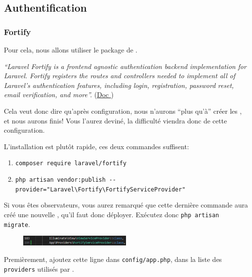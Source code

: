 \subsection[Authentification]{Authentification}\label{sec:auth}

\subsubsection[Fortify][laravel.com/docs/10.x/fortify]{Fortify}

Pour cela, nous allons utiliser le package \fortify{} de \laravel{}. 

\textit{``Laravel Fortify is a frontend agnostic authentication backend implementation for Laravel. Fortify registers the routes and controllers needed to implement all of Laravel's authentication features, including login, registration, password reset, email verification, and more''.} (\href{https://laravel.com/docs/10.x/fortify#what-is-fortify}{Doc \laravel})

Cela veut donc dire qu'après configuration, nous n'aurons ``plus qu'à'' créer les \views, et nous aurons finis! Vous l'aurez deviné, la difficulté viendra donc de cette configuration.

L'installation est plutôt rapide, ces deux commandes suffisent:
\begin{enumerate}
    \item \verb|composer require laravel/fortify|
    \item \verb|php artisan vendor:publish --provider="Laravel\Fortify\FortifyServiceProvider"|
\end{enumerate}

Si vous êtes observateurs, vous aurez remarqué que cette dernière commande aura créé une nouvelle \migration{}, qu'il faut donc déployer. Exécutez donc \verb|php artisan migrate|.



\begin{figure}
    \vspace{-0.5cm}
    \includegraphics[width=0.5\textwidth]{figures-C1/config_app.pdf}
\end{figure}
Premièrement, ajoutez cette ligne dans \linebreak \verb|config/app.php|, dans la liste des \verb|providers| utilisés par \laravel{}.

